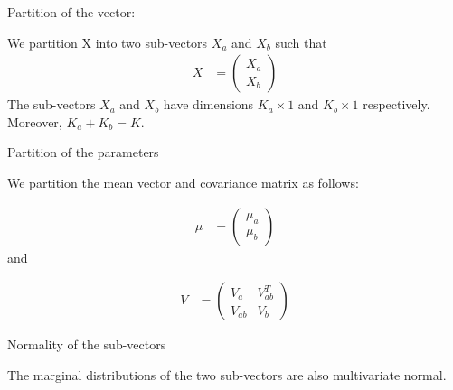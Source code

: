 Partition of the vector:

 We partition X into two sub-vectors $X_a$ and $X_b$ such that
\begin{align*}
	X &= \begin{pmatrix}
		X_a \\
		X_b
	\end{pmatrix}
\end{align*}
The sub-vectors $X_a$ and $X_b$ have dimensions $K_a \times 1$ and $K_b \times 1$ respectively. Moreover, $K_a + K_b = K$.

Partition of the parameters

We partition the mean vector and covariance matrix as follows:

\begin{align*}
	\mu &= \begin{pmatrix}
		\mu_a \\
		\mu_b
	\end{pmatrix}
\end{align*}
and 

\begin{align*}
	V &= \begin{pmatrix}
		V_a & V_{ab}^T \\
		V_{ab} & V_b
	\end{pmatrix}
\end{align*}

Normality of the sub-vectors

The marginal distributions of the two sub-vectors are also multivariate normal.

